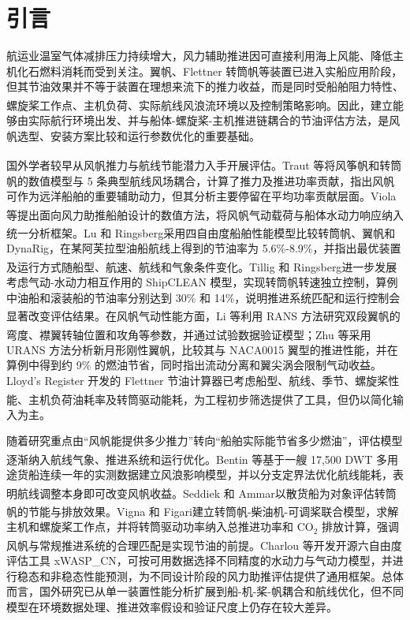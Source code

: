 \documentclass[UTF8,a4paper,twoside,zihao=5,fontset=windows]{ctexart}
\begin{document}
\section{引言}

航运业温室气体减排压力持续增大，风力辅助推进因可直接利用海上风能、降低主机化石燃料消耗而受到关注。翼帆、Flettner 转筒帆等装置已进入实船应用阶段，但其节油效果并不等于装置在理想来流下的推力收益，而是同时受船舶阻力特性、螺旋桨工作点、主机负荷、实际航线风浪流环境以及控制策略影响\textsuperscript{\cite{lr2021flettner,lu2020,tillig2020,vigna2023}}。因此，建立能够由实际航行环境出发、并与船体-螺旋桨-主机推进链耦合的节油评估方法，是风帆选型、安装方案比较和运行参数优化的重要基础。

国外学者较早从风帆推力与航线节能潜力入手开展评估。Traut 等\textsuperscript{\cite{traut2014}}将风筝帆和转筒帆的数值模型与 5 条典型航线风场耦合，计算了推力及推进功率贡献，指出风帆可作为远洋船舶的重要辅助动力，但其分析主要停留在平均功率贡献层面。Viola 等\textsuperscript{\cite{viola2015}}提出面向风力助推船舶设计的数值方法，将风帆气动载荷与船体水动力响应纳入统一分析框架。Lu 和 Ringsberg\textsuperscript{\cite{lu2020}}采用四自由度船舶性能模型比较转筒帆、翼帆和 DynaRig，在某阿芙拉型油船航线上得到的节油率为 5.6\%-8.9\%，并指出最优装置及运行方式随船型、航速、航线和气象条件变化。Tillig 和 Ringsberg\textsuperscript{\cite{tillig2020}}进一步发展考虑气动-水动力相互作用的 ShipCLEAN 模型，实现转筒帆转速独立控制，算例中油船和滚装船的节油率分别达到 30\% 和 14\%，说明推进系统匹配和运行控制会显著改变评估结果。在风帆气动性能方面，Li 等\textsuperscript{\cite{li2020}}利用 RANS 方法研究双段翼帆的弯度、襟翼转轴位置和攻角等参数，并通过试验数据验证模型；Zhu 等\textsuperscript{\cite{zhu2023}}采用 URANS 方法分析新月形刚性翼帆，比较其与 NACA0015 翼型的推进性能，并在算例中得到约 9\% 的燃油节省，同时指出流动分离和翼尖涡会限制气动收益。Lloyd's Register 开发的 Flettner 节油计算器已考虑船型、航线、季节、螺旋桨性能、主机负荷油耗率及转筒驱动能耗\textsuperscript{\cite{lr2021flettner}}，为工程初步筛选提供了工具，但仍以简化输入为主。

随着研究重点由“风帆能提供多少推力”转向“船舶实际能节省多少燃油”，评估模型逐渐纳入航线气象、推进系统和运行优化。Bentin 等\textsuperscript{\cite{bentin2016}}基于一艘 17,500 DWT 多用途货船连续一年的实测数据建立风浪影响模型，并以分支定界法优化航线能耗，表明航线调整本身即可改变风帆收益。Seddiek 和 Ammar\textsuperscript{\cite{seddiek2021}}以散货船为对象评估转筒帆的节能与排放效果。Vigna 和 Figari\textsuperscript{\cite{vigna2023}}建立转筒帆-柴油机-可调桨联合模型，求解主机和螺旋桨工作点，并将转筒驱动功率纳入总推进功率和 CO$_2$ 排放计算，强调风帆与常规推进系统的合理匹配是实现节油的前提。Charlou 等\textsuperscript{\cite{charlou2023}}开发开源六自由度评估工具 xWASP\_CN，可按可用数据选择不同精度的水动力与气动力模型，并进行稳态和非稳态性能预测，为不同设计阶段的风力助推评估提供了通用框架。总体而言，国外研究已从单一装置性能分析扩展到船-机-桨-帆耦合和航线优化，但不同模型在环境数据处理、推进效率假设和验证尺度上仍存在较大差异。
\end{document}
